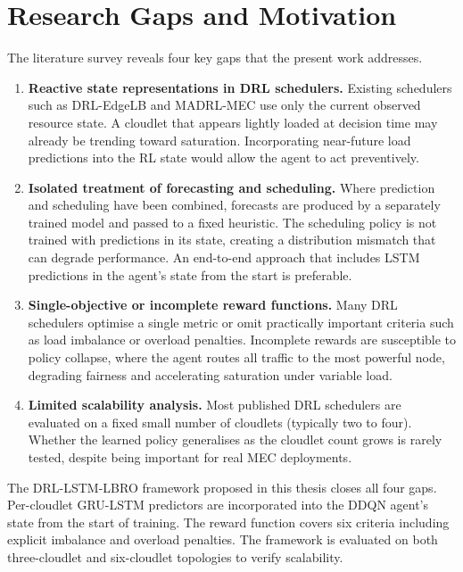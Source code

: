 \section{Research Gaps and Motivation}
\label{sec:lit_gaps}

The literature survey reveals four key gaps that the present work
addresses.

\begin{enumerate}

  \item \textbf{Reactive state representations in DRL schedulers.}
  Existing schedulers such as DRL-EdgeLB and MADRL-MEC use only
  the current observed resource state. A cloudlet that appears
  lightly loaded at decision time may already be trending toward
  saturation. Incorporating near-future load predictions into the
  RL state would allow the agent to act preventively.

  \item \textbf{Isolated treatment of forecasting and scheduling.}
  Where prediction and scheduling have been combined, forecasts are
  produced by a separately trained model and passed to a fixed
  heuristic. The scheduling policy is not trained with predictions
  in its state, creating a distribution mismatch that can degrade
  performance. An end-to-end approach that includes LSTM
  predictions in the agent's state from the start is preferable.

  \item \textbf{Single-objective or incomplete reward functions.}
  Many DRL schedulers optimise a single metric or omit practically
  important criteria such as load imbalance or overload penalties.
  Incomplete rewards are susceptible to policy collapse, where the
  agent routes all traffic to the most powerful node, degrading
  fairness and accelerating saturation under variable load.

  \item \textbf{Limited scalability analysis.}
  Most published DRL schedulers are evaluated on a fixed small
  number of cloudlets (typically two to four). Whether the learned
  policy generalises as the cloudlet count grows is rarely tested,
  despite being important for real MEC deployments.

\end{enumerate}

The DRL-LSTM-LBRO framework proposed in this thesis closes all
four gaps. Per-cloudlet GRU-LSTM predictors are incorporated into
the DDQN agent's state from the start of training. The reward
function covers six criteria including explicit imbalance and
overload penalties. The framework is evaluated on both
three-cloudlet and six-cloudlet topologies to verify scalability.
